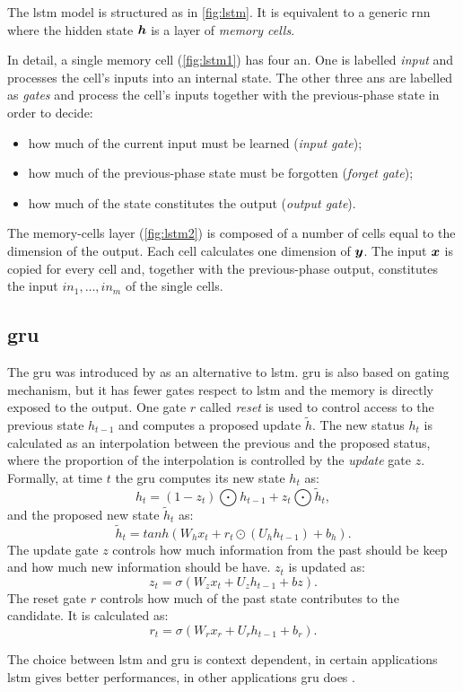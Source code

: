 The \ac{lstm} model is structured as in \cref{fig:lstm}. It is
equivalent to a
generic \ac{rnn} where the hidden state $\bm{h}$ is a
layer of \emph{memory cells}.

In detail, a single
memory cell (\cref{fig:lstm1}) has four \acf{an}. One is labelled \emph{input}
and processes the cell's 
inputs into an internal state. The other three \acp{an} are labelled as
\emph{gates} and process the cell's inputs together with the previous-phase
state in order to decide:
\begin{itemize}
\item how much of the current input must be learned
  (\emph{input gate});
\item how much of the previous-phase state must be forgotten
  (\emph{forget gate});
\item how much of the state constitutes the output (\emph{output gate}).
\end{itemize}

The memory-cells layer (\cref{fig:lstm2}) is composed of a number of
cells equal to the dimension of the output. Each cell
calculates one dimension of $\bm{y}$. The input $\bm{x}$ is copied
for every cell and, together with the previous-phase
output,
constitutes the input $in_1,\dots,in_m$ of the single cells.

\subsection{\acf{gru}}
The \ac{gru} was introduced by \cite{cho2014learning} as an
alternative to \ac{lstm}. \ac{gru} is also based on gating mechanism,
but it has fewer gates respect to \ac{lstm} and the memory is directly
exposed to the output. One gate $r$ called \emph{reset} is used to control
access to the previous state $h_{t-1}$ and computes a proposed update
$\tilde{h}$. The new 
status $h_t$ is calculated as an interpolation between the previous and the
proposed status, where the proportion of the interpolation is
controlled by the \emph{update} gate $z$.
Formally, at time $t$ the \ac{gru} computes its new state $h_t$ as:
\begin{equation*}
  h_t=(1-z_t)\bigodot h_{t-1}+z_t\bigodot\tilde{h}_t,
\end{equation*}
and the proposed new state $\tilde{h}_t$ as:
\begin{equation*}
  \tilde{h}_t=tanh(W_h x_t+r_t\odot(U_h h_{t-1})+b_h).
\end{equation*}
The update gate $z$ controls how much information from the past should be
keep and how much new information should be have. $z_t$ is updated as:
\begin{equation*}
  z_t=\sigma(W_z x_t+U_z h_{t-1}+bz).
\end{equation*}
The reset gate $r$ controls how much of the past state contributes to
the candidate. It is calculated as:
\begin{equation*}
  r_t=\sigma(W_r x_r+U_r h_{t-1}+b_r).
\end{equation*}

The choice between \ac{lstm} and \ac{gru} is context dependent, in
certain applications \ac{lstm} gives better performances, in other
applications \ac{gru} does \cite{yin2017comparative}. 




